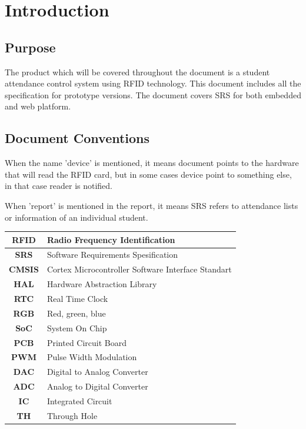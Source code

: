 \documentclass{scrreprt}
\begin{document}
\chapter{Introduction}

\section{Purpose}
The product which will be covered throughout the document is a student attendance control system using RFID technology. This document includes all the specification for prototype versions. The document covers SRS for both embedded and web platform.

\section{Document Conventions}

When the name 'device' is mentioned, it means document points to the hardware that will read the RFID card, but in some cases device point to something else, in that case reader is notified.

When 'report' is mentioned in the report, it means SRS refers to attendance lists or information of an individual student.

\begin{table}[H]
 \begin{center}
\begin{tabular}{|c|l|}
\hline
\textbf{RFID}  & Radio Frequency Identification                     \\ \hline
\textbf{SRS}   & Software Requirements Spesification                \\ \hline
\textbf{CMSIS} & Cortex Microcontroller Software Interface Standart \\ \hline
\textbf{HAL}   & Hardware Abstraction Library                       \\ \hline
\textbf{RTC}   & Real Time Clock                                    \\ \hline
\textbf{RGB}   & Red, green, blue                                    \\ \hline
\textbf{SoC}   & System On Chip                                    \\ \hline
\textbf{PCB}   & Printed Circuit Board                                    \\ \hline
\textbf{PWM}   & Pulse Width Modulation                                   \\ \hline
\textbf{DAC}   & Digital to Analog Converter                                    \\ \hline
\textbf{ADC}   & Analog to Digital Converter                                    \\ \hline
\textbf{IC}  & Integrated Circuit  \\ \hline
\textbf{TH}  & Through Hole  \\ \hline
\end{tabular}
 \end{center}
\end{table} 
\end{document}
